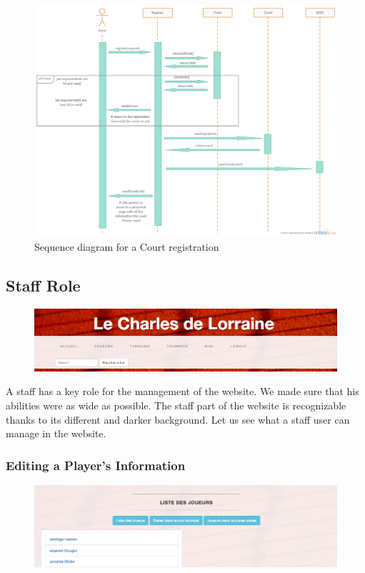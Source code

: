 \documentclass[a4paper, 12pt]{article}
\begin{document}
\begin{figure}[h]
   \caption{\label{courtseq} Sequence diagram for a Court registration}
  \includegraphics[scale=0.4]{courtseq.png}
\end{figure}

\FloatBarrier
\newpage

\subsection*{Staff Role}

\begin{figure}[h]
\includegraphics[scale=0.5]{staffaccueil.png}
\end{figure}
\FloatBarrier
A staff has a key role for the management of the website. We made sure that his abilities were as wide as possible. The staff part of the website is recognizable thanks to its different and darker background. Let us see what a staff user can manage in the website.\\

\subsubsection*{Editing a Player's Information}
\begin{figure}[h]
\includegraphics[scale=0.5]{listeplayers.png}
\end{figure}
\end{document}
